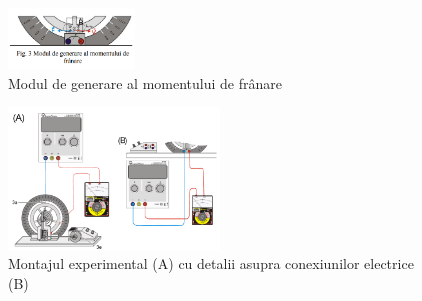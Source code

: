 \documentclass[a4paper]{article}
\begin{document}
\begin{figure}[htbp]
	\centering
	\includegraphics[width=0.3\textwidth]{franare.png}
	\caption{Modul de generare al momentului de
		frânare}
	\label{fig:franare}
\end{figure}

\begin{figure}[hbtp]
	\centering
	\includegraphics[width=0.5\textwidth]{device.png}
	\caption{Montajul experimental (A) cu detalii asupra conexiunilor electrice
		(B)}
	\label{fig:device}
\end{figure}
\end{document}
